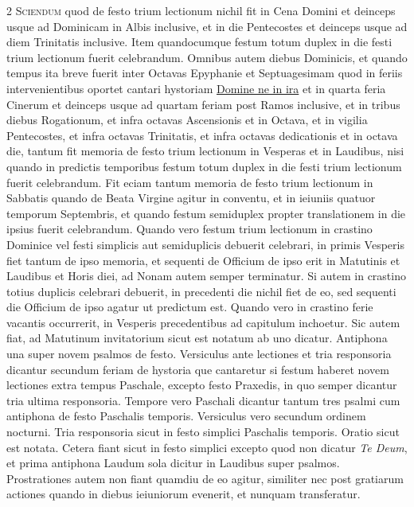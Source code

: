 \begin{multicols*}{2}
{\color{Red} }
\lettrine[lines=2]{\zallmancaps \color{Blue} S}{ciendum} quod de festo trium lectionum nichil fit in Cena Domini et deinceps usque ad Dominicam in Albis inclusive, et in die Pentecostes et deinceps usque ad diem Trinitatis inclusive.
Item quandocumque festum totum duplex in die festi trium lectionum fuerit celebrandum.
Omnibus autem diebus Dominicis, et quando tempus ita breve fuerit inter Octavas Epyphanie et Septuagesimam quod in feriis intervenientibus oportet cantari hystoriam \hyperlink{domine-ne-in-ira}{Domine ne in ira} et in quarta feria Cinerum et deinceps usque ad quartam feriam post Ramos inclusive, et in tribus diebus Rogationum, et infra octavas Ascensionis et in Octava, et in vigilia Pentecostes, et infra octavas Trinitatis, et infra octavas dedicationis et in octava die, tantum fit memoria de festo trium lectionum in Vesperas et in Laudibus, nisi quando in predictis temporibus festum totum duplex in die festi trium lectionum fuerit celebrandum.
Fit eciam tantum memoria de festo trium lectionum in Sabbatis quando de Beata Virgine agitur in conventu, et in ieiuniis quatuor temporum Septembris, et quando festum semiduplex propter translationem in die ipsius fuerit celebrandum.
Quando vero festum trium lectionum in crastino Dominice vel festi simplicis aut semiduplicis debuerit celebrari, in primis Vesperis fiet tantum de ipso memoria, et sequenti de Officium de ipso erit in Matutinis et Laudibus et Horis diei, ad Nonam autem semper terminatur.
Si autem in crastino totius duplicis celebrari debuerit, in precedenti die nichil fiet de eo, sed sequenti die Officium de ipso agatur ut predictum est.
Quando vero in crastino ferie vacantis occurrerit, in Vesperis precedentibus ad capitulum inchoetur.
Sic autem fiat, ad Matutinum invitatorium sicut est notatum ab uno dicatur. Antiphona una super novem psalmos de festo. Versiculus ante lectiones et tria responsoria dicantur secundum feriam de hystoria que cantaretur si festum haberet novem lectiones extra tempus Paschale, excepto festo Praxedis, in quo semper dicantur tria ultima responsoria. Tempore vero Paschali dicantur tantum tres psalmi cum antiphona de festo Paschalis temporis. Versiculus vero secundum ordinem nocturni. Tria responsoria sicut in festo simplici Paschalis temporis. Oratio sicut est notata. Cetera fiant sicut in festo simplici excepto quod non dicatur \textit{Te Deum}, et prima antiphona Laudum sola dicitur in Laudibus super psalmos. Prostrationes autem non fiant quamdiu de eo agitur, similiter nec post gratiarum actiones quando in diebus ieiuniorum evenerit, et nunquam transferatur.


\end{multicols*}
